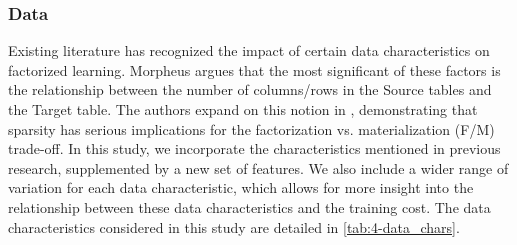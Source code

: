 \subsubsection{Data}
Existing literature has recognized the impact of certain data characteristics on factorized learning. Morpheus \cite{morpheus} argues that the most significant of these factors is the relationship between the number of columns/rows in the Source tables and the Target table. The authors expand on this notion in \cite{MorpheusFI}, demonstrating that sparsity has serious implications for the factorization vs. materialization (F/M) trade-off. In this study, we incorporate the characteristics mentioned in previous research, supplemented by a new set of features. We also include a wider range of variation for each data characteristic, which allows for more insight into the relationship between these data characteristics and the training cost. The data characteristics considered in this study are detailed in \autoref{tab:4-data_chars}.

